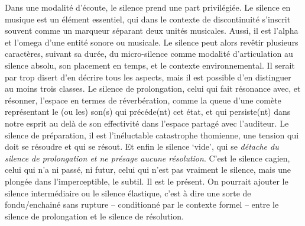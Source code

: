 \documentclass{article}
\begin{document}
Dans une modalité d'écoute, le silence prend une part privilégiée. 
Le silence en musique est un élément essentiel, qui dans le contexte de discontinuité s'inscrit souvent comme un marqueur séparant deux unités musicales. Aussi, il est l'alpha et l'omega d'une entité sonore ou musicale. Le silence peut alors revêtir plusieurs caractères, suivant sa durée, du micro-silence comme modalité d'articulation au silence absolu, son placement en temps, et le contexte environnemental. Il serait par trop disert d'en décrire tous les aspects, mais il est possible d'en distinguer au moins trois classes. Le silence de prolongation, celui qui fait résonance avec, et résonner, l'espace en termes de réverbération, comme la queue d'une comète représentant le (ou les) son(s) qui précéde(nt) cet état, et qui persiste(nt) dans notre esprit au delà de son effectivité dans l'espace partagé avec l'auditeur. %
Le silence de préparation, il est l'inéluctable catastrophe thomienne\label{efn:thom}, une tension qui doit se résoudre et qui se résout. Et enfin le silence `vide', qui se \textit{détache du silence de prolongation et ne présage aucune résolution}. C'est le silence cagien, celui qui n'a ni passé, ni futur, celui qui n'est pas vraiment le silence, mais une plongée dans l'imperceptible, le subtil. Il est le présent.
On pourrait ajouter le silence intermédiaire ou le silence élastique, c'est à dire une sorte de fondu/enchainé sans rupture -- conditionné par le contexte formel -- entre le silence de prolongation et le silence de résolution.
\end{document}
